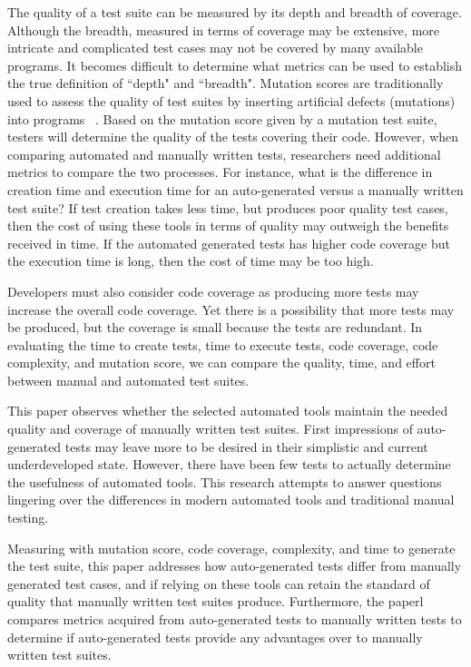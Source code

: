 \documentclass[conference]{IEEEtran}
\begin{document}
The quality of a test suite can be measured by its depth and breadth of coverage. Although the breadth, measured in terms of coverage may be extensive, more intricate and complicated test cases may not be covered by many available programs. It becomes difficult to determine what metrics can be used to establish the true definition of ``depth" and ``breadth". Mutation scores are traditionally used to assess the quality of test suites by inserting artificial defects (mutations) into programs ~\cite{Fraser:2010:MGU:1831708.1831728}. Based on the mutation score given by a mutation test suite, testers will determine the quality of the tests covering their code. However, when comparing automated and manually written tests, researchers need additional metrics to compare the two processes. For instance, what is the difference in creation time and execution time for an auto-generated versus a manually written test suite? If test creation takes less time, but produces poor quality test cases, then the cost of using these tools in terms of quality may outweigh the benefits received in time. If the automated generated tests has higher code coverage but the execution time is long, then the cost of time may be too high. 

Developers must also consider code coverage as producing more tests may increase the overall code coverage. Yet there is a possibility that more tests may be produced, but the coverage is small because the tests are redundant. In evaluating the time to create tests, time to execute tests, code coverage, code complexity, and mutation score, we can compare the quality, time, and effort between manual and automated test suites.

This paper observes whether the selected automated tools maintain the needed quality and coverage of manually written test suites. First impressions of auto-generated tests may leave more to be desired in their simplistic and current underdeveloped state. However, there have been few tests to actually determine the usefulness of automated tools. This research attempts to answer questions lingering over the differences in modern automated tools and traditional manual testing.

Measuring with mutation score, code coverage, complexity, and time to generate the test suite, this paper addresses how auto-generated tests differ from manually generated test cases, and if relying on these tools can retain the standard of quality that manually written test suites produce. Furthermore, the paperl compares metrics acquired from auto-generated tests to manually written tests to determine if auto-generated tests provide any advantages over to manually written test suites.
\end{document}
